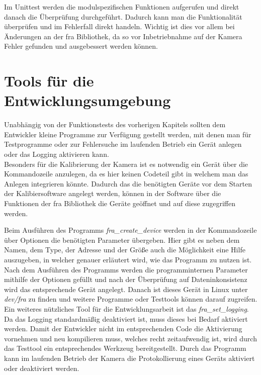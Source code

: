 Im Unittest werden die modulspezifischen Funktionen aufgerufen und direkt danach die Überprüfung durchgeführt. Dadurch kann man die Funktionalität überprüfen und im Fehlerfall direkt handeln. Wichtig ist dies vor allem bei Änderungen an der \ac{fra} Bibliothek, da so vor Inbetriebnahme auf der Kamera Fehler gefunden und ausgebessert werden können.


\section{Tools für die Entwicklungsumgebung}
Unabhängig von der Funktionstests des vorherigen Kapitels sollten dem Entwickler kleine Programme zur Verfügung gestellt werden, mit denen man für Testprogramme oder zur Fehlersuche im laufenden Betrieb ein Gerät anlegen oder das Logging aktivieren kann.\\


Besonders für die Kalibrierung der Kamera ist es notwendig ein Gerät über die Kommandozeile anzulegen, da es hier keinen Codeteil gibt in welchem man das Anlegen integrieren könnte. Dadurch das die benötigten Geräte vor dem Starten der Kalibiersoftware angelegt werden, können in der Software über die Funktionen der \ac{fra} Bibliothek die Geräte geöffnet und auf diese zugegriffen werden.


Beim Ausführen des Programms \textit{fra\_create\_device} werden in der Kommandozeile über Optionen die benötigten Parameter übergeben. Hier gibt es neben dem Namen, dem Type, der Adresse und der Größe auch die Möglichkeit eine Hilfe auszugeben, in welcher genauer erläutert wird, wie das Programm zu nutzen ist. 
Nach dem Ausführen des Programms werden die programminternen Parameter mithilfe der Optionen gefüllt und nach der Überprüfung auf Dateninkonsistenz wird das entsprechende Gerät angelegt. 
Danach ist dieses Gerät in Linux unter \textit{dev/fra} zu finden und weitere Programme oder Testtools können darauf zugreifen.\\

Ein weiteres nützliches Tool für die Entwicklungsarbeit ist das \textit{fra\_set\_logging}. Da das Logging standardmäßig deaktiviert ist, muss dieses bei Bedarf aktiviert werden. Damit der Entwickler nicht im entsprechenden Code die Aktivierung vornehmen und neu kompilieren muss, welches recht zeitaufwendig ist, wird durch das Testtool ein entsprechendes Werkzeug bereitgestellt. Durch das Programm kann im laufenden Betrieb der Kamera die Protokollierung eines Geräts aktiviert oder deaktiviert werden.



